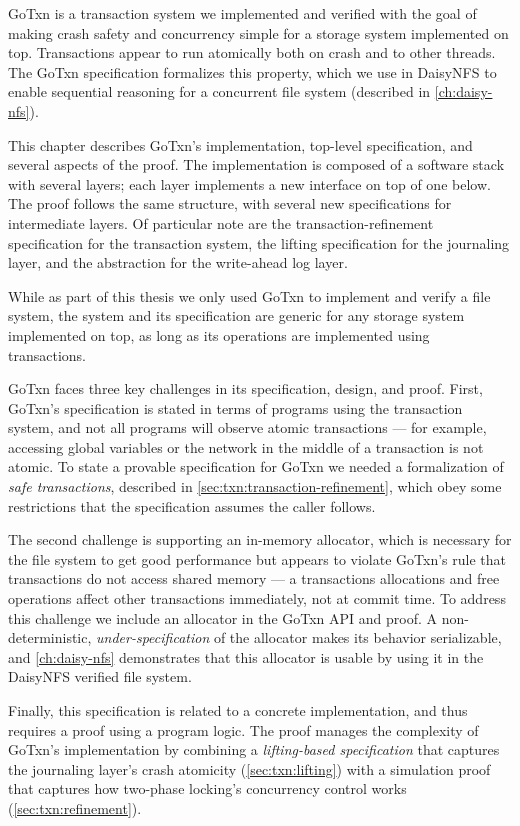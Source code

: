 GoTxn is a transaction system we implemented and verified with the goal of
making crash safety and concurrency simple for a storage system implemented on
top. Transactions appear to run atomically both on crash and to other threads.
The GoTxn specification formalizes this property, which we use in DaisyNFS to
enable sequential reasoning for a concurrent file system (described in
\cref{ch:daisy-nfs}).

This chapter describes GoTxn's implementation, top-level specification, and
several aspects of the proof. The implementation is composed of a software stack
with several layers; each layer implements a new interface on top of one
below. The proof follows the same structure, with several new specifications for
intermediate layers. Of particular note are the
transaction-refinement specification for the transaction system, the lifting
specification for the journaling layer, and the abstraction for the write-ahead
log layer.

While as part of this thesis we only used GoTxn to implement and verify a file
system, the system and its specification are generic for any
storage system implemented on top, as long as its operations are implemented
using transactions.

GoTxn faces three key challenges in its specification, design, and proof.
First, GoTxn's specification is stated in terms of programs using the
transaction system, and not all programs will observe atomic transactions ---
for example, accessing global variables or the network in the middle of a
transaction is not atomic. To state a provable specification for GoTxn we needed
a formalization of \emph{safe transactions}, described in \cref{sec:txn:transaction-refinement},
which obey some restrictions that the specification assumes the caller follows.

The second challenge is supporting an in-memory allocator, which is necessary
for the file system to get good performance but appears to violate GoTxn's rule
that transactions do not access shared memory --- a transactions allocations and
free operations affect other transactions immediately, not at commit time.
To address this challenge we include an
allocator in the GoTxn API and proof. A non-deterministic,
\emph{under-specification} of the allocator makes its behavior serializable, and
\cref{ch:daisy-nfs} demonstrates that this allocator is usable by using it in
the DaisyNFS verified file system.

Finally, this specification is related to a concrete implementation, and thus
requires a proof using a program logic. The proof manages the complexity of
GoTxn's implementation by combining a \emph{lifting-based specification} that
captures the journaling layer's crash atomicity (\cref{sec:txn:lifting}) with a
simulation proof that captures how two-phase locking's concurrency control works
(\cref{sec:txn:refinement}).

